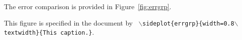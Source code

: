 \documentclass[paper,revised]{geophysics}
\begin{document}
The error comparison is provided in Figure~\ref{fig:errgrp}.

{This figure is specified in the document by \texttt{
    $\backslash$sideplot\{errgrp\}\{width=0.8$\backslash$text\-width\}\{This caption.\}}.
}







\newpage


\end{document}
